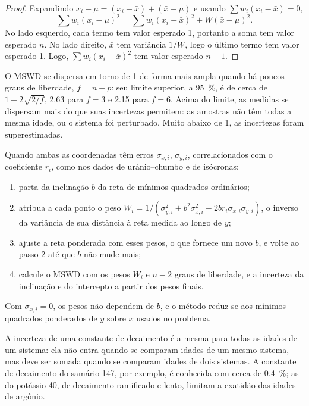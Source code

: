 \begin{proof}
Expandindo $x_i - \mu = (x_i - \bar x) + (\bar x - \mu)$ e usando $\sum
w_i(x_i - \bar x) = 0$,
\[
\sum w_i(x_i - \mu)^2 = \sum w_i(x_i - \bar x)^2 + W(\bar x - \mu)^2.
\]
No lado esquerdo, cada termo tem valor esperado 1, portanto a soma tem valor esperado $n$. No
lado direito, $\bar x$ tem variância $1/W$, logo o último termo tem valor esperado 1.
Logo, $\sum w_i(x_i - \bar x)^2$ tem valor esperado $n - 1$.
\end{proof}

O MSWD se dispersa em torno de 1 de forma mais ampla quando há poucos graus de liberdade,
$f = n - p$: seu limite superior, a \qty{95}{\percent}, é de cerca de $1 +
2\sqrt{2/f}$, 2.63 para $f = 3$ e 2.15 para $f = 6$. Acima do limite, as
medidas se dispersam mais do que suas incertezas permitem: as amostras não
têm todas a mesma idade, ou o sistema foi perturbado. Muito abaixo de 1, as
incertezas foram superestimadas.

\begin{method}\label{met:b3:advanced-geochronology:york}
Quando ambas as coordenadas têm erros $\sigma_{x,i}$, $\sigma_{y,i}$, correlacionados
com o coeficiente $r_i$, como nos dados de urânio--chumbo e de isócronas:
\begin{enumerate}
\item parta da inclinação $b$ da reta de mínimos quadrados ordinários;
\item atribua a cada ponto o peso $W_i = 1/(\sigma_{y,i}^2 + b^2\sigma_{x,i}^2 -
2br_i\sigma_{x,i}\sigma_{y,i})$, o inverso da variância de sua distância à
reta medida ao longo de $y$;
\item ajuste a reta ponderada com esses pesos, o que fornece um novo $b$, e
volte ao passo 2 até que $b$ não mude mais;
\item calcule o MSWD com os pesos $W_i$ e $n - 2$ graus de liberdade,
e a incerteza da inclinação e do intercepto a partir dos pesos finais.
\end{enumerate}
Com $\sigma_{x,i} = 0$, os pesos não dependem de $b$, e o método
reduz-se aos mínimos quadrados ponderados de $y$ sobre $x$ usados no problema.
\end{method}

A incerteza de uma constante de decaimento é a mesma para todas as idades de um sistema:
ela não entra quando se comparam idades de um mesmo sistema, mas deve ser somada
quando se comparam idades de dois sistemas. A constante de decaimento do samário-147, por
exemplo, é conhecida com cerca de \qty{0.4}{\percent}; as do potássio-40,
de decaimento ramificado e lento, limitam a exatidão das idades de argônio.


